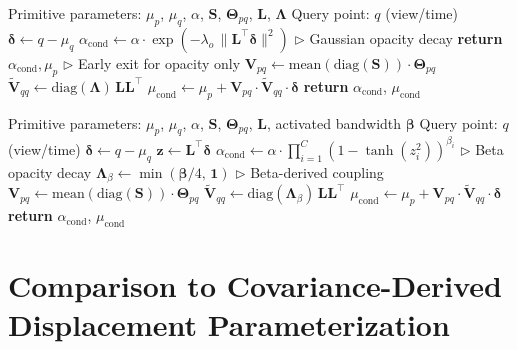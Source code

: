 \documentclass{article}
\newcommand{\return}{\textbf{return }}
\newcommand{\Comment}[1]{\hfill $\triangleright$ #1}
\newcommand{\dgs}{\textit{d}GS\xspace}
\newcommand{\dbs}{\textit{d}BS\xspace}
\newcommand{\dgso}{\textit{d}GS-O\xspace}
\theoremstyle{plain}
\theoremstyle{definition}
\theoremstyle{remark}
\begin{document}
\begin{algorithm}[h]
\caption{\dgs{} Conditional Slicing}
\label{alg:slice}
\begin{algorithmic}[1]
\REQUIRE Primitive parameters: $\mu_p$, $\mu_q$, $\alpha$, $\mathbf{S}$, $\boldsymbol{\Theta}_{pq}$, $\mathbf{L}$, $\boldsymbol{\Lambda}$
\REQUIRE Query point: $q$ (view/time)
\STATE $\boldsymbol{\delta} \gets q - \mu_q$
\STATE $\alpha_{\text{cond}} \gets \alpha \cdot \exp(-\lambda_o\,\|\mathbf{L}^\top \boldsymbol{\delta}\|^2)$ \Comment{Gaussian opacity decay}
\IF{\dgso{} variant}
    \STATE \return  $\alpha_{\text{cond}}, \mu_p$ \Comment{Early exit for opacity only}
\ENDIF
\STATE $\mathbf{V}_{pq} \gets \text{mean}(\text{diag}(\mathbf{S})) \cdot \boldsymbol{\Theta}_{pq}$
\STATE $\tilde{\mathbf{V}}_{qq} \gets \mathrm{diag}(\boldsymbol{\Lambda})\,\mathbf{L}\mathbf{L}^\top$
\STATE $\mu_{\text{cond}} \gets \mu_p + \mathbf{V}_{pq} \cdot \tilde{\mathbf{V}}_{qq} \cdot \boldsymbol{\delta}$
\STATE \return $\alpha_{\text{cond}}$, $\mu_{\text{cond}}$
\end{algorithmic}
\end{algorithm}

\begin{algorithm}[h]
\caption{\dbs{} Conditional Slicing}
\label{alg:slice_dbs}
\begin{algorithmic}[1]
\REQUIRE Primitive parameters: $\mu_p$, $\mu_q$, $\alpha$, $\mathbf{S}$, $\boldsymbol{\Theta}_{pq}$, $\mathbf{L}$, activated bandwidth $\boldsymbol{\beta}$
\REQUIRE Query point: $q$ (view/time)
\STATE $\boldsymbol{\delta} \gets q - \mu_q$
\STATE $\mathbf{z} \gets \mathbf{L}^\top \boldsymbol{\delta}$
\STATE $\alpha_{\text{cond}} \gets \alpha \cdot \prod_{i=1}^{C} (1 - \tanh(z_i^2))^{\beta_i}$ \Comment{Beta opacity decay}
\STATE $\boldsymbol{\Lambda}_\beta \gets \min(\boldsymbol{\beta}/4,\, \mathbf{1})$ \Comment{Beta-derived coupling}
\STATE $\mathbf{V}_{pq} \gets \text{mean}(\text{diag}(\mathbf{S})) \cdot \boldsymbol{\Theta}_{pq}$
\STATE $\tilde{\mathbf{V}}_{qq} \gets \mathrm{diag}(\boldsymbol{\Lambda}_\beta)\,\mathbf{L}\mathbf{L}^\top$
\STATE $\mu_{\text{cond}} \gets \mu_p + \mathbf{V}_{pq} \cdot \tilde{\mathbf{V}}_{qq} \cdot \boldsymbol{\delta}$
\STATE \return $\alpha_{\text{cond}}$, $\mu_{\text{cond}}$
\end{algorithmic}
\end{algorithm}

\section{Comparison to Covariance-Derived Displacement Parameterization}
\label{sec:spatial_scaling_proof}
\end{document}

